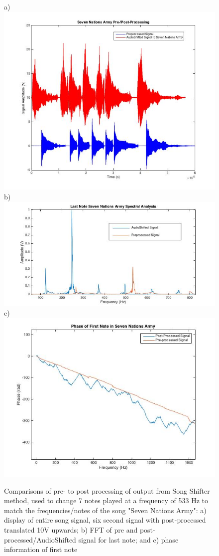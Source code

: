 \documentclass{article}
\begin{document}
    \begin{figure}[H]
        \centering
        a)\includegraphics[scale=0.45]{SevenNationsArmyFigure.jpg}
        b)\includegraphics[scale = 0.45]{LastNote.jpg}
        c)\includegraphics[scale = 0.45]{phaseProb.jpg}
        \caption{Comparisons of pre- to post processing of output from Song Shifter method, used to change 7 notes played at a frequency of 533 Hz to match the frequencies/notes of the song "Seven Nations Army": a) display of entire song signal, six second signal with post-processed translated 10V upwards; b) FFT of pre and post-processed/AudioShifted signal for last note; and c) phase information of first note}
        \label{fig:my_label}
    \end{figure}
\end{document}
